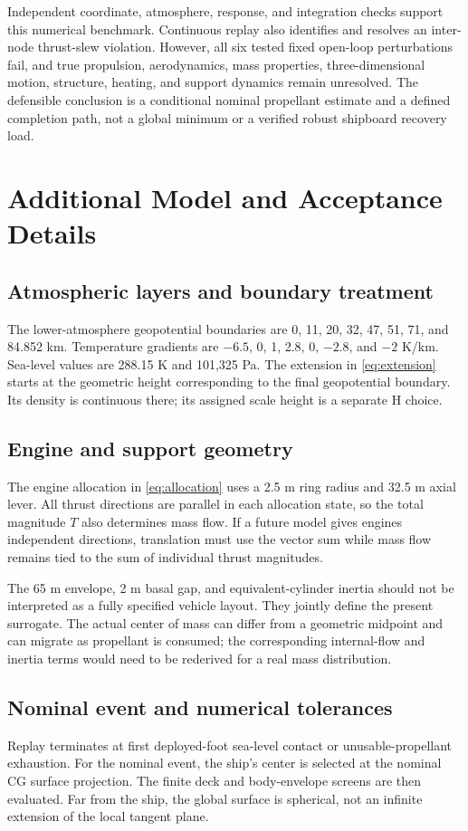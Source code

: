 \documentclass[11pt,a4paper]{article}
\begin{document}
Independent coordinate, atmosphere, response, and integration checks support this numerical benchmark. Continuous replay also identifies and resolves an inter-node thrust-slew violation. However, all six tested fixed open-loop perturbations fail, and true propulsion, aerodynamics, mass properties, three-dimensional motion, structure, heating, and support dynamics remain unresolved. The defensible conclusion is a conditional nominal propellant estimate and a defined completion path, not a global minimum or a verified robust shipboard recovery load.

\clearpage
\appendix
\section{Additional Model and Acceptance Details}
\subsection{Atmospheric layers and boundary treatment}
The lower-atmosphere geopotential boundaries are 0, 11, 20, 32, 47, 51, 71, and 84.852 km. Temperature gradients are $-6.5$, 0, 1, 2.8, 0, $-2.8$, and $-2$ K/km. Sea-level values are 288.15 K and 101,325 Pa. The extension in \cref{eq:extension} starts at the geometric height corresponding to the final geopotential boundary. Its density is continuous there; its assigned scale height is a separate H choice.

\subsection{Engine and support geometry}
The engine allocation in \cref{eq:allocation} uses a 2.5 m ring radius and 32.5 m axial lever. All thrust directions are parallel in each allocation state, so the total magnitude $T$ also determines mass flow. If a future model gives engines independent directions, translation must use the vector sum while mass flow remains tied to the sum of individual thrust magnitudes.

The 65 m envelope, 2 m basal gap, and equivalent-cylinder inertia should not be interpreted as a fully specified vehicle layout. They jointly define the present surrogate. The actual center of mass can differ from a geometric midpoint and can migrate as propellant is consumed; the corresponding internal-flow and inertia terms would need to be rederived for a real mass distribution.

\subsection{Nominal event and numerical tolerances}
Replay terminates at first deployed-foot sea-level contact or unusable-propellant exhaustion. For the nominal event, the ship's center is selected at the nominal CG surface projection. The finite deck and body-envelope screens are then evaluated. Far from the ship, the global surface is spherical, not an infinite extension of the local tangent plane.
\end{document}

